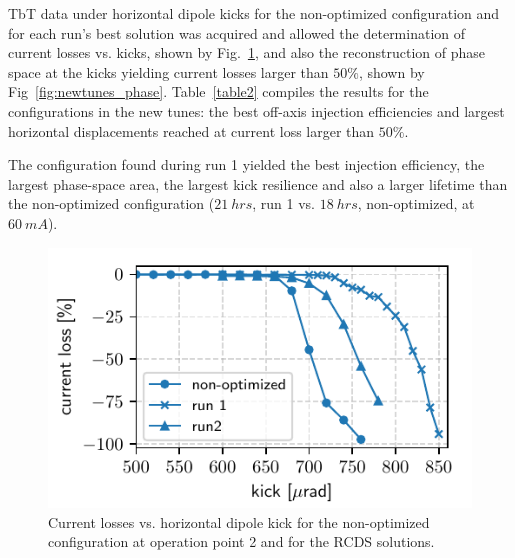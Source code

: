 \documentclass[a4paper,
               keeplastbox,   %
               ]{jacow}
\begin{document}
TbT data under horizontal dipole kicks for the non-optimized configuration and for each run's best solution was acquired and allowed the determination of current losses vs. kicks, shown by Fig.~\ref{fig:loss_kicks_newtunes}, and also the reconstruction of phase space at the kicks yielding current losses larger than $50\%$, shown by Fig~\ref{fig:newtunes_phase}. Table~\ref{table2} compiles the results for the configurations in the new tunes: the best off-axis injection efficiencies and largest horizontal displacements reached at current loss larger than $50\%$. 

The configuration found during run 1 yielded the best injection efficiency, the largest phase-space area, the largest kick resilience and also a larger lifetime than the non-optimized configuration ($21~\unit{hrs}$, run 1 vs. $18~\unit{hrs}$, non-optimized, at $60~\unit{mA}$). 
\begin{figure}[!h]
   \includegraphics[width=\columnwidth]{new_tunes_kick_resilience.pdf}
   \caption{Current losses vs. horizontal dipole kick for the non-optimized configuration at operation point 2 and for the RCDS solutions.}
   \label{fig:loss_kicks_newtunes}
\end{figure}
\end{document}
